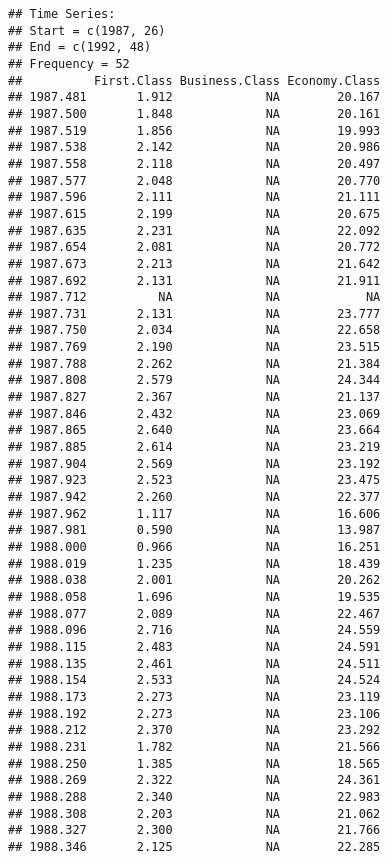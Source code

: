 \documentclass[]{book}
\begin{document}
\begin{verbatim}
## Time Series:
## Start = c(1987, 26) 
## End = c(1992, 48) 
## Frequency = 52 
##          First.Class Business.Class Economy.Class
## 1987.481       1.912             NA        20.167
## 1987.500       1.848             NA        20.161
## 1987.519       1.856             NA        19.993
## 1987.538       2.142             NA        20.986
## 1987.558       2.118             NA        20.497
## 1987.577       2.048             NA        20.770
## 1987.596       2.111             NA        21.111
## 1987.615       2.199             NA        20.675
## 1987.635       2.231             NA        22.092
## 1987.654       2.081             NA        20.772
## 1987.673       2.213             NA        21.642
## 1987.692       2.131             NA        21.911
## 1987.712          NA             NA            NA
## 1987.731       2.131             NA        23.777
## 1987.750       2.034             NA        22.658
## 1987.769       2.190             NA        23.515
## 1987.788       2.262             NA        21.384
## 1987.808       2.579             NA        24.344
## 1987.827       2.367             NA        21.137
## 1987.846       2.432             NA        23.069
## 1987.865       2.640             NA        23.664
## 1987.885       2.614             NA        23.219
## 1987.904       2.569             NA        23.192
## 1987.923       2.523             NA        23.475
## 1987.942       2.260             NA        22.377
## 1987.962       1.117             NA        16.606
## 1987.981       0.590             NA        13.987
## 1988.000       0.966             NA        16.251
## 1988.019       1.235             NA        18.439
## 1988.038       2.001             NA        20.262
## 1988.058       1.696             NA        19.535
## 1988.077       2.089             NA        22.467
## 1988.096       2.716             NA        24.559
## 1988.115       2.483             NA        24.591
## 1988.135       2.461             NA        24.511
## 1988.154       2.533             NA        24.524
## 1988.173       2.273             NA        23.119
## 1988.192       2.273             NA        23.106
## 1988.212       2.370             NA        23.292
## 1988.231       1.782             NA        21.566
## 1988.250       1.385             NA        18.565
## 1988.269       2.322             NA        24.361
## 1988.288       2.340             NA        22.983
## 1988.308       2.203             NA        21.062
## 1988.327       2.300             NA        21.766
## 1988.346       2.125             NA        22.285

\end{verbatim}
\end{document}
